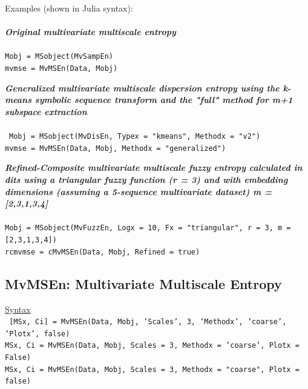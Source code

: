 \documentclass[12pt, a4paper, titlepage, openany]{book}
\begin{document}
\noindent Examples (shown in Julia syntax)$\colon$ \footnotesize
\\ \ \\ \noindent \emph{\textbf{Original multivariate multiscale entropy}} \cite{MvSamp1}
\\ \ \\ \noindent  \indent \texttt{Mobj = MSobject(MvSampEn) \\
\indent mvmse = MvMSEn(Data, Mobj)}

\noindent \emph{\textbf{Generalized multivariate multiscale dispersion entropy using the k-means symbolic sequence transform and the "full" method for m+1 subspace extraction}} \cite{MvSamp1} \cite{MvDisp1}\\
\\ \ \indent \texttt{Mobj = MSobject(MvDisEn, Typex = "kmeans", Methodx = "v2")\\
\indent mvmse = MvMSEn(Data, Mobj, Methodx = "generalized")}


\noindent \emph{\textbf{Refined-Composite multivariate multiscale fuzzy entropy calculated in dits using a triangular fuzzy function (r = 3) and with embedding dimensions (assuming a 5-sequence multivariate dataset) m = [2,3,1,3,4]}} \cite{MvFuzz1}
\\ \ \\ \indent \texttt{Mobj = MSobject(MvFuzzEn, Logx = 10, Fx = "triangular", r = 3, m = [2,3,1,3,4])\\
\indent rcmvmse = cMvMSEn(Data, Mobj, Refined = true)}







\newpage
\subsection{\normalsize MvMSEn: \hspace{15mm} Multivariate Multiscale Entropy} \label{MvMSEn}
\noindent\ul{Syntax} \vspace{6mm} \\ \noindent \texttt{\footnotesize
[MSx, Ci] = MvMSEn(Data, Mobj, 'Scales', 3, ‘Methodx’, 'coarse', ‘Plotx’, false)\\
MSx, Ci = MvMSEn(Data, Mobj, Scales = 3, Methodx = 'coarse', Plotx = False)\\ 
MSx, Ci = MvMSEn(Data, Mobj, Scales = 3, Methodx = "coarse", Plotx = false)}
\end{document}
